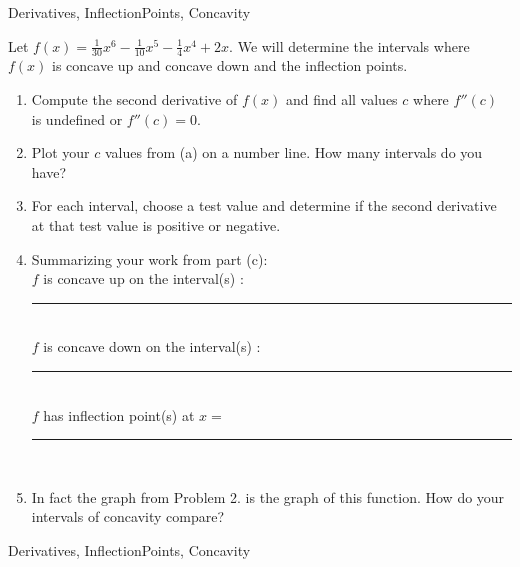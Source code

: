 \begin{tagblock}{Derivatives, InflectionPoints, Concavity}
\begin{question}

Let $\displaystyle f(x) = \frac {1}{30}x^6 - \frac{1}{10}x^5 - \frac{1}{4}x^4 + 2x$.  We will determine the intervals where $f(x)$ is concave up and concave down and the inflection points.
\begin{enumerate}
\item Compute the second derivative of $f(x)$ and find all values $c$ where $f''(c)$ is undefined or $f''(c) = 0$.

\vspace{2in}
\item Plot your $c$ values from (a) on a number line.  How many intervals do you have?

\vspace{.7in}
\item For each interval, choose a test value and determine if the second derivative at that test value is positive or negative.  

\vspace{3in}
\item Summarizing your work from part (c):  \\
$f$ is concave up on the interval(s) :  \rule{8cm}{0.1mm} \\
\bigskip
$f$ is concave down on the interval(s) :  \rule{8cm}{0.1mm} \\

\bigskip
$f$ has inflection point(s) at $x = $   \rule{8cm}{0.1mm} \\

\bigskip
\item In fact the graph from Problem 2. is the graph of this function.  How do your intervals of concavity compare?  
\end{enumerate}




	
\begin{tags}
	   Derivatives, InflectionPoints, Concavity
\end{tags}
	
\begin{diary}
\end{diary}
	
\begin{solution}
	   
\end{solution}
	
\end{question}

\end{tagblock}


